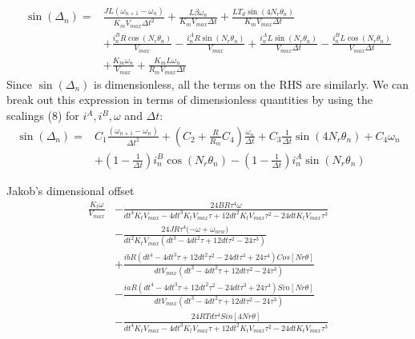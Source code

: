 \documentclass{article}
\begin{document}
\begin{appendix}
\begin{align}
\sin(\Delta_n)=&\frac{J L (\omega_{n+1}-\omega_n)}{ K_m V_{max} \Delta t^2}
+\frac{L \beta  \omega_n}{K_m V_{max} \Delta t}
+\frac{L T_d \sin(4 N_r \theta_n)}{K_m  V_{max} \Delta t}\\
&+\frac{i^B_n R \cos(N_r \theta_n)}{V_{max}}
-\frac{i^A_n R \sin(N_r \theta_n)}{V_{max}}
+\frac{i^A_n L \sin(N_r \theta_n)}{V_{max} \Delta t}
-\frac{i^B_n L \cos(N_r \theta_n)}{V_{max} \Delta t}\nonumber\\ 
&+\frac{K_m \omega_n}{V_{max}} 
+\frac{K_m  L \omega_n}{R_m V_{max} \Delta t}\nonumber
\end{align}
Since $\sin(\Delta_n)$ is dimensionless, all the terms on the RHS are similarly. We can break out this expression in terms of dimensionless quantities by using the scalings (8) for $i^A, i^B, \omega$ and $\Delta t$:
\begin{align}
\sin(\Delta_n)=&C_1\frac{(\omega_{n+1}-\omega_n)}{ \Delta t^2}
+(C_2+\frac{R}{R_m} C_4  )\frac{ \omega_n}{ \Delta t}
+C_3 \frac{1}{\Delta t} \sin(4 N_r \theta_n) +C_4 \omega_n\\
&+\left(1-\frac{1}{\Delta t}\right)i^B_n \cos(N_r \theta_n)
-\left(1-\frac{1}{\Delta t} \right) i^A_n \sin(N_r \theta_n)\nonumber
\end{align}

Jakob's dimensional offset
\begin{align*}
\frac{K_t \omega }{V_{max}}
&-\frac{24 B R \tau ^4 \omega }{{dt}^4 K_t {V_{max}} -4 {dt}^3 {K_t} {V_{max}} \tau +12 {dt}^2 {K_t} {V_{max}} \tau ^2-24 {dt} {K_t} {V_{max}} \tau ^3}\\
&-\frac{24 J R \tau ^4 (-\omega +{\omega_{new})}}{{dt}^2 {K_t} {V_{max}} \left({dt}^3-4 {dt}^2 \tau +12 {dt} \tau ^2-24 \tau ^3\right)}\\
&+\frac{{ib} R \left({dt}^4-4 {dt}^3 \tau +12 {dt}^2 \tau ^2-24 {dt} \tau ^3+24 \tau ^4\right) {Cos}[{Nr} \theta ]}{{dt} {V_{max}} \left({dt}^3-4 {dt}^2 \tau +12 {dt} \tau ^2-24 \tau ^3\right)}\\
&-\frac{{ia} R \left({dt}^4-4 {dt}^3 \tau +12 {dt}^2 \tau ^2-24 {dt} \tau ^3+24 \tau ^4\right) {Sin}[{Nr} \theta ]}{{dt} {V_{max}} \left({dt}^3-4 {dt}^2 \tau +12 {dt} \tau ^2-24 \tau ^3\right)}\\
& -\frac{24 R {Td} \tau ^4 {Sin}[4 {Nr} \theta ]}{{dt}^4 {K_t} {V_{max}}-4 {dt}^3 {K_t} {V_{max}} \tau +12 {dt}^2 {K_t} {V_{max}} \tau ^2-24 {dt} {K_t} {V_{max}} \tau^3}
\end{align*}


\end{appendix}
\end{document}
